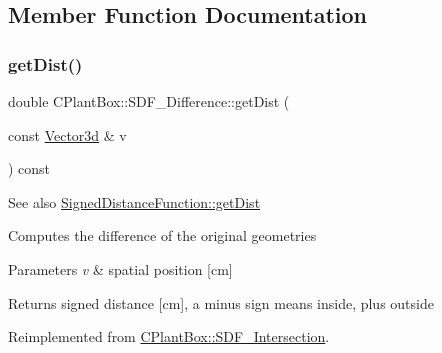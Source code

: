 \subsection{Member Function Documentation}
\mbox{\label{classCPlantBox_1_1SDF__Difference_a3026bc983827af9842f32b1f72808ac1}} 
\subsubsection{\texorpdfstring{get\+Dist()}{getDist()}}
{\footnotesize\ttfamily double C\+Plant\+Box\+::\+S\+D\+F\+\_\+\+Difference\+::get\+Dist (\begin{DoxyParamCaption}\item[{const \hyperlink{classCPlantBox_1_1Vector3d}{Vector3d} \&}]{v }\end{DoxyParamCaption}) const\hspace{0.3cm}{\ttfamily [virtual]}}

\begin{DoxySeeAlso}{See also}
\hyperlink{classCPlantBox_1_1SignedDistanceFunction_a8e58237574af3673906bba84d5d14ee8}{Signed\+Distance\+Function\+::get\+Dist}
\end{DoxySeeAlso}
Computes the difference of the original geometries


\begin{DoxyParams}{Parameters}
{\em v} & spatial position \mbox{[}cm\mbox{]} \\
\hline
\end{DoxyParams}
\begin{DoxyReturn}{Returns}
signed distance \mbox{[}cm\mbox{]}, a minus sign means inside, plus outside 
\end{DoxyReturn}


Reimplemented from \hyperlink{classCPlantBox_1_1SDF__Intersection_a2ed780db3881844484086de3f73543e5}{C\+Plant\+Box\+::\+S\+D\+F\+\_\+\+Intersection}.

\mbox{\label{classCPlantBox_1_1SDF__Difference_a63fc8597ea841a973ab29d7aa6cea3ca}} 
